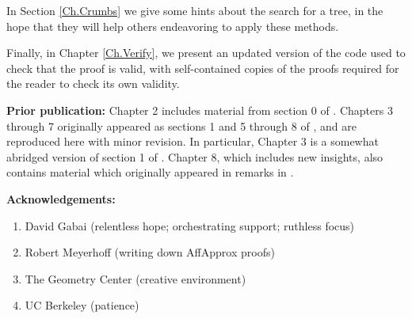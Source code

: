 In Section \ref{Ch.Crumbs} we give some hints about the search for a tree,
in the hope that they will help others endeavoring to apply these methods.

Finally, in Chapter \ref{Ch.Verify}, we present an updated version of
the code used to check that the proof is valid,
with self-contained copies of the proofs required for the reader
to check its own validity.
\vskip 8pt

\noindent\textbf {Prior publication:} Chapter 2 includes material from section 0 of \cite{GMT}.
Chapters 3 through 7 originally appeared as sections 1 and 5 through 8 of \cite{GMT},
and are reproduced here with minor revision.  In particular, Chapter 3 is a somewhat abridged version of section 1 of \cite{GMT}.
Chapter 8, which includes new insights, also contains material which originally appeared in remarks in \cite{GMT}.

\vskip 8pt

\noindent\textbf {Acknowledgements:}
\begin{enumerate}
	\item David Gabai (relentless hope; orchestrating support; ruthless focus)
	\item Robert Meyerhoff (writing down AffApprox proofs)
	\item The Geometry Center (creative environment)
	\item UC Berkeley (patience)
\end{enumerate}
